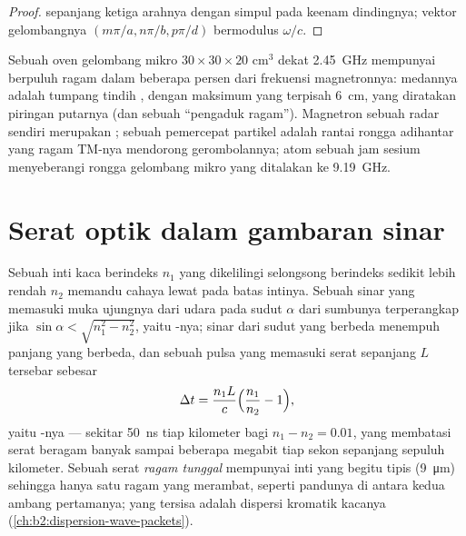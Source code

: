 \begin{proof}
 sepanjang ketiga arahnya dengan simpul pada keenam dindingnya;
vektor gelombangnya $(m\pi/a, n\pi/b, p\pi/d)$ bermodulus $\omega/c$.
\end{proof}

\begin{example}\label{ex:b2:guided-waves:cavities}
Sebuah oven gelombang mikro $30 \times 30 \times 20$ cm$^3$ dekat \qty{2.45}{GHz} mempunyai
berpuluh ragam dalam beberapa persen dari frekuensi magnetronnya:
medannya adalah tumpang tindih , dengan maksimum
yang terpisah \qty{6}{cm}, yang diratakan piringan putarnya (dan sebuah ``pengaduk ragam'').
Magnetron sebuah radar sendiri merupakan ; sebuah pemercepat
partikel adalah rantai rongga adihantar yang ragam TM-nya
mendorong gerombolannya; atom sebuah jam sesium menyeberangi rongga
gelombang mikro yang ditalakan ke \qty{9.19}{GHz}.
\end{example}

\section{Serat optik dalam gambaran sinar}

\begin{proposition}\label{prop:b2:guided-waves:fibre}
Sebuah inti kaca berindeks $n_1$ yang dikelilingi selongsong berindeks sedikit lebih
rendah $n_2$ memandu cahaya lewat  pada batas
intinya. Sebuah sinar yang memasuki muka ujungnya dari udara pada sudut $\alpha$ dari
sumbunya terperangkap jika $\sin\alpha < \sqrt{n_1^2 - n_2^2}$, yaitu \emph{}-nya; sinar dari sudut yang berbeda menempuh panjang yang berbeda, dan sebuah
pulsa yang memasuki serat sepanjang $L$ tersebar sebesar
\[
\Delta t = \frac{n_1L}c\Bigl(\frac{n_1}{n_2} - 1\Bigr) ,
\]
yaitu \emph{}-nya --- sekitar \qty{50}{ns} tiap kilometer bagi $n_1
- n_2 = 0.01$, yang membatasi serat beragam banyak sampai beberapa megabit tiap
sekon sepanjang sepuluh kilometer. Sebuah serat \emph{ragam tunggal} mempunyai inti yang begitu
tipis (\qty{9}{\micro m}) sehingga hanya satu ragam yang merambat, seperti pandunya
di antara kedua ambang pertamanya; yang tersisa adalah dispersi
kromatik kacanya (\cref{ch:b2:dispersion-wave-packets}).
\end{proposition}

